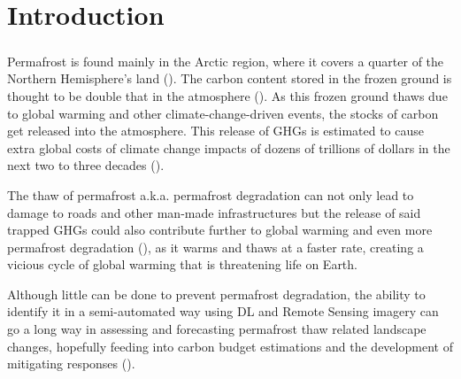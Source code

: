 

\chapter{Introduction}
\label{introduction}



\paragraph{}
Permafrost is found mainly in the Arctic region, where it covers a quarter of the Northern Hemisphere's land (\cite{OLTHOF2015194}). The carbon content stored in the frozen ground is thought to be double that in the atmosphere (\cite{climatechange12}). As this frozen ground thaws due to global warming and other climate-change-driven events, the stocks of carbon get released into the atmosphere. This release of \gls{GHGs} is estimated to cause extra global costs of climate change impacts of dozens of trillions of dollars in the next two to three decades (\cite{climatechange34}). 

The thaw of permafrost \gls{a.k.a.} permafrost degradation can not only lead to damage to roads and other man-made infrastructures but the release of said trapped \gls{GHGs} could also contribute further to global warming and even more permafrost degradation (\cite{MURTON2021857}), as it warms and thaws at a faster rate, creating a vicious cycle of global warming that is threatening life on Earth.

Although little can be done to prevent permafrost degradation, the ability to identify it in a semi-automated way using \gls{DL} and Remote Sensing imagery can go a long way in assessing and forecasting permafrost thaw related landscape changes, hopefully feeding into carbon budget estimations and the development of mitigating responses (\cite{monitoringperma}).

